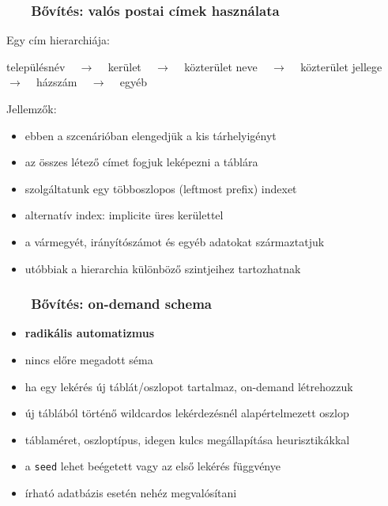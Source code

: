 \documentclass[
]{beamer}
\newcommand{\slidetitle}[2]{\frametitle{{\small #1 ~ \ding{226} ~ } \normalsize \textbf{#2} }}
\begin{document}
\begin{frame}
    \slidetitle{\sectionshorttitle}{Bővítés: valós postai címek használata}
    
    { \color{beamer@blendedblue} Egy cím hierarchiája: }
    
    \begin{center}
        településnév ~ $\rightarrow$ ~
        kerület ~ $\rightarrow$ ~
        közterület neve ~ $\rightarrow$ ~
        közterület jellege ~ $\rightarrow$ ~
        házszám ~ $\rightarrow$ ~
        egyéb
    \end{center}
    
    \vspace{0.5em}
    
    { \color{beamer@blendedblue} Jellemzők: }
    
    \begin{itemize}
        \setlength\itemsep{0.3em}
        \item ebben a szcenárióban elengedjük a kis tárhelyigényt
        \item az összes létező címet fogjuk leképezni a táblára
        \item szolgáltatunk egy többoszlopos (leftmost prefix) indexet
        \item alternatív index: implicite üres kerülettel
        \item a vármegyét, irányítószámot és egyéb adatokat származtatjuk
        \item utóbbiak a hierarchia különböző szintjeihez tartozhatnak
    \end{itemize}
\end{frame}

\begin{frame}
    \slidetitle{\sectionshorttitle}{Bővítés: on-demand schema}
    
    
    \begin{itemize}
        \setlength\itemsep{1em}
        \item \textbf{radikális automatizmus}
        \item nincs előre megadott séma
        \item ha egy lekérés új táblát/oszlopot tartalmaz, on-demand létrehozzuk
        \item új táblából történő wildcardos lekérdezésnél alapértelmezett oszlop
        \item táblaméret, oszloptípus, idegen kulcs megállapítása heurisztikákkal
        \item a \texttt{seed} lehet beégetett vagy az első lekérés függvénye
        \item írható adatbázis esetén nehéz megvalósítani
    \end{itemize}
\end{frame}
\end{document}
